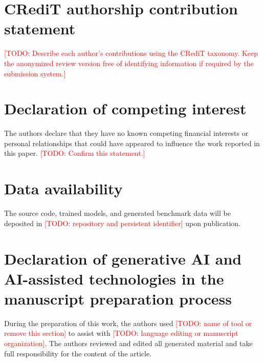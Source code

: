 \documentclass[preprint,12pt]{elsarticle}
\newcommand{\TODO}[1]{\textcolor{red}{[TODO: #1]}}
\begin{document}
\section*{CRediT authorship contribution statement}
\TODO{Describe each author's contributions using the CRediT taxonomy. Keep the
anonymized review version free of identifying information if required by the
submission system.}

\section*{Declaration of competing interest}
The authors declare that they have no known competing financial interests or
personal relationships that could have appeared to influence the work reported
in this paper. \TODO{Confirm this statement.}

\section*{Data availability}
The source code, trained models, and generated benchmark data will be deposited
in \TODO{repository and persistent identifier} upon publication.

\section*{Declaration of generative AI and AI-assisted technologies in the
manuscript preparation process}
During the preparation of this work, the authors used \TODO{name of tool or
remove this section} to assist with \TODO{language editing or manuscript
organization}. The authors reviewed and edited all generated material and take
full responsibility for the content of the article.



\end{document}
